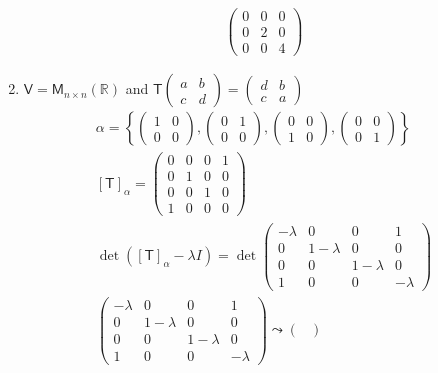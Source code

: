 \begin{enumerate}
\begin{align}
\begin{pmatrix}
0 & 0 & 0\\
0 & 2 & 0\\
0 & 0 & 4
\end{pmatrix}
\end{align}
\setcounter{enumii}{7}
\item $\mathsf{V} = \mathsf{M}_{n\times n}(\mathbb{R})$ and
  $\mathsf{T}\begin{pmatrix} a & b\\ c & d\end{pmatrix}
  = \begin{pmatrix} d & b\\ c & a \end{pmatrix}$
\begin{gather}
\alpha = \left\{\begin{pmatrix} 1 & 0 \\ 0 &
     0\end{pmatrix},\begin{pmatrix} 0 & 1 \\ 0 &
     0\end{pmatrix},\begin{pmatrix} 0 & 0 \\ 1 &
     0\end{pmatrix},\begin{pmatrix} 0 & 0 \\ 0 &
     1\end{pmatrix}\right \}\\
[\mathsf{T}]_\alpha = \begin{pmatrix}
0 & 0 & 0 & 1\\
0 & 1 & 0 & 0\\
0 & 0 & 1 & 0\\
1 & 0 & 0 & 0
\end{pmatrix}\\
\det{([\mathsf{T}]_\alpha-\lambda I)} = \det{\begin{pmatrix}
-\lambda & 0 & 0 & 1\\
0 & 1-\lambda & 0 & 0\\
0 & 0 & 1-\lambda & 0\\
1 & 0 & 0 & -\lambda
  \end{pmatrix}}\\
\begin{pmatrix}
-\lambda & 0 & 0 & 1\\
0 & 1-\lambda & 0 & 0\\
0 & 0 & 1-\lambda & 0\\
1 & 0 & 0 & -\lambda
  \end{pmatrix}
\leadsto
\begin{pmatrix}

\end{pmatrix}
\end{gather}
\end{enumerate}
